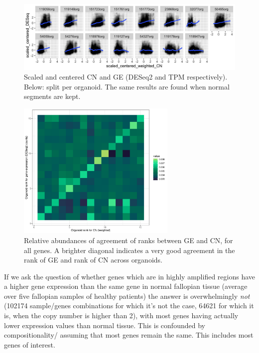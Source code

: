 \documentclass{article}
\begin{document}
\begin{figure}[h]
\includegraphics[width=\textwidth]{../../RNASeq_and_CN/figures/scatterplot_normCNweighted_normDESeq_perorg2.png}
\caption{Scaled and centered CN and GE (DESeq2 and TPM respectively). Below: split per organoid. The same results are found when normal segments are kept. \label{fig:scaled_CN_GE}} %
\end{figure}


\begin{figure}[h]
\centering
\includegraphics[width=3in]{../../RNASeq_and_CN/figures/rankplot_CNweighted_deseq.pdf}
\caption{Relative abundances of agreement of ranks between GE and CN, for all genes. A brighter diagonal indicates a very good agreement in the rank of GE and rank of CN across organoids.\label{fig:rank_CN_GE}}
\end{figure}

\medskip

If we ask the question of whether genes which are in highly amplified regions have a higher gene expression than the same gene in normal fallopian tissue (average over five fallopian samples of healthy patients) the answer is overwhelmingly \emph{not} (102174 sample/genes combinations for which it's not the case,  64621 for which it is, when the copy number is higher than 2), with most genes having actually lower expression values than normal tissue. This is confounded by compositionality/ assuming that most genes remain the same. This includes most genes of interest.
\end{document}
